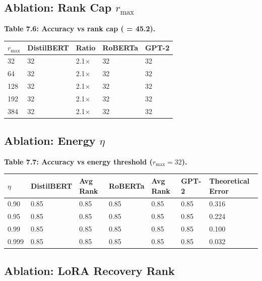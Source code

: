 \subsection{Ablation: Rank Cap $r_\text{max}$}

\textbf{Table 7.6: Accuracy vs rank cap (  = 45.2).}

\begin{table}[H]
\centering
\small
\begin{tabular}{lllll}
\toprule
\textbf{$r_\text{max}$} & \textbf{DistilBERT} & \textbf{Ratio} & \textbf{RoBERTa} & \textbf{GPT-2} \\
\midrule
32 & 32 & 2.1$\times$ & 32 & 32 \\
64 & 32 & 2.1$\times$ & 32 & 32 \\
128 & 32 & 2.1$\times$ & 32 & 32 \\
192 & 32 & 2.1$\times$ & 32 & 32 \\
384 & 32 & 2.1$\times$ & 32 & 32 \\
\bottomrule
\end{tabular}
\end{table}

\subsection{Ablation: Energy $\eta$}

\textbf{Table 7.7: Accuracy vs energy threshold ($r_\text{max} = 32$).}

\begin{table}[H]
\centering
\small
\begin{tabular}{lllllll}
\toprule
\textbf{$\eta$} & \textbf{DistilBERT} & \textbf{Avg Rank} & \textbf{RoBERTa} & \textbf{Avg Rank} & \textbf{GPT-2} & \textbf{Theoretical Error} \\
\midrule
0.90 & 0.85 & 0.85 & 0.85 & 0.85 & 0.85 & 0.316 \\
0.95 & 0.85 & 0.85 & 0.85 & 0.85 & 0.85 & 0.224 \\
0.99 & 0.85 & 0.85 & 0.85 & 0.85 & 0.85 & 0.100 \\
0.999 & 0.85 & 0.85 & 0.85 & 0.85 & 0.85 & 0.032 \\
\bottomrule
\end{tabular}
\end{table}

\subsection{Ablation: LoRA Recovery Rank}

